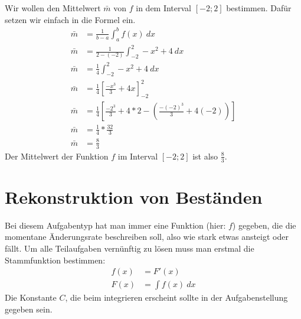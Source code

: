 \begin{flushleft}
    Wir wollen den Mittelwert $\bar{m}$ von $f$ in dem Interval $\left[-2;2\right]$ bestimmen.
    Dafür setzen wir einfach in die Formel ein.
    \begin{align}
        \bar{m}&=\frac{1}{b-a}\int_{a}^{b} f(x) \ dx \\
        \bar{m}&=\frac{1}{2-(-2)}\int_{-2}^{2} -x^2+4 \ dx \\
        \bar{m}&=\frac{1}{4}\int_{-2}^{2} -x^2+4 \ dx \\
        \bar{m}&=\frac{1}{4}\left[\frac{-x^3}{3}+4x\right]_{-2}^{2} \\
        \bar{m}&=\frac{1}{4}\left[\frac{-2^3}{3}+4*2-\left(\frac{-(-2)^3}{3}+4(-2)\right)\right] \\
        \bar{m}&=\frac{1}{4}*\frac{32}{3} \\
        \bar{m}&=\frac{8}{3}
    \end{align}
    Der Mittelwert der Funktion $f$ im Interval $\left[-2;2\right]$ ist also $\frac{8}{3}$.
\end{flushleft}

\begin{center}
\end{center}

\section{Rekonstruktion von Beständen}

\begin{flushleft}
    Bei diesem Aufgabentyp hat man immer eine Funktion (hier: $f$) gegeben, die die momentane Änderungsrate beschreiben soll, also wie stark etwas ansteigt oder fällt.
    Um alle Teilaufgaben vernünftig zu lösen muss man erstmal die Stammfunktion bestimmen:
    \begin{align}
        f(x)&=F'(x) \\
        F(x)&=\int f(x) \ dx
    \end{align}
    Die Konstante $C$, die beim integrieren erscheint sollte in der Aufgabenstellung gegeben sein.
\end{flushleft}


